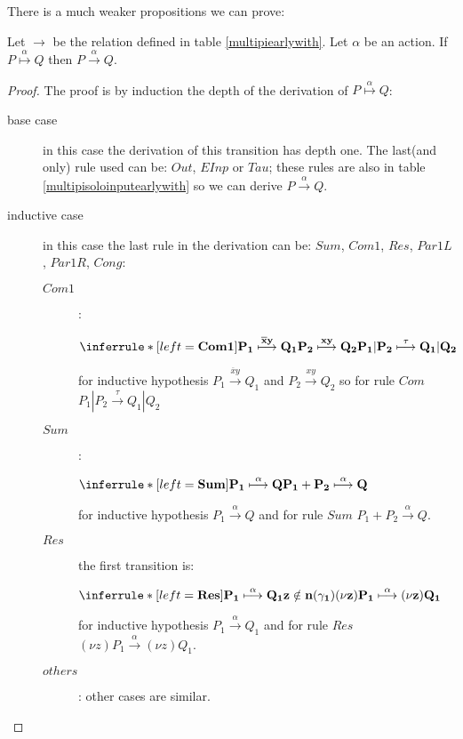 There is a much weaker propositions we can prove:
\begin{proposition}
  Let $\rightarrow$ be the relation defined in table \ref{multipiearlywith}. Let $\alpha$ be an action. If $P \stackrel{\alpha}{\longmapsto} Q$ then $P\xrightarrow{\alpha} Q$.
  \begin{proof}
    The proof is by induction the depth of the derivation of $P \stackrel{\alpha}{\longmapsto} Q$:
    \begin{description}
      \item[base case]
	in this case the derivation of this transition has depth one. The last(and only) rule used can be: $Out$, $EInp$ or $Tau$; these rules are also in table \ref{multipisoloinputearlywith} so we can derive $P\xrightarrow{\alpha} Q$. 
      \item[inductive case]
	in this case the last rule in the derivation can be: $Sum$, $Com1$, $Res$, $Par1L$, $Par1R$, $Cong$:
	\begin{description}
	  \item[$Com1$]:
	    \begin{center}
	      $\inferrule* [left=\bf{Com1}]{
		  P_{1} \stackrel{\overline{x}y}{\longmapsto} Q_{1}
		\\
		  P_{2} \stackrel{xy}{\longmapsto} Q_{2}
	      }{
		P_{1}|P_{2} \stackrel{\tau}{\longmapsto} Q_{1}|Q_{2}
	      }$ 
	    \end{center}
	    for inductive hypothesis $P_{1} \xrightarrow{\overline{x}y} Q_{1}$ and $P_{2} \xrightarrow{xy} Q_{2}$ so for rule $Com$ $P_{1}|P_{2} \xrightarrow{\tau} Q_{1}|Q_{2}$
	  \item[$Sum$]:
	    \begin{center}
	      $\inferrule* [left=\bf{Sum}]{
		P_{1} \stackrel{\alpha}{\longmapsto} Q
	      }{
		P_{1}+P_{2} \stackrel{\alpha}{\longmapsto} Q
	      }$ 
	    \end{center}
	    for inductive hypothesis $P_{1} \xrightarrow{\alpha} Q$ and for rule $Sum$ $P_{1}+P_{2} \xrightarrow{\alpha} Q$.
	      \item[$Res$] the first transition is:
		\begin{center}
		  $\inferrule* [left=\bf{Res}]{
			P_{1} \stackrel{\alpha}{\longmapsto} Q_{1}
		      \\
			z\notin n(\gamma_{1})
		    }{
		      (\nu z) P_{1} \stackrel{\alpha}{\longmapsto} (\nu z)Q_{1}
		  }$ 
		\end{center}		
		for inductive hypothesis $P_{1} \xrightarrow{\alpha} Q_{1}$ and for rule $Res$ $(\nu z)P_{1} \xrightarrow{\alpha} (\nu z)Q_{1}$.
	      \item[$others$]: other cases are similar.
	    \end{description}	    
    \end{description}	    
  \end{proof}
\end{proposition}


